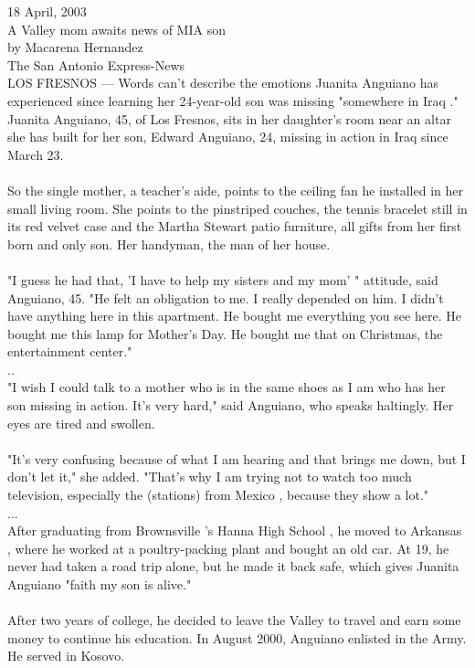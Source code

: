 \documentclass[a4paper]{article}
\begin{document}
\large
18 April, 2003\\
A Valley mom awaits news of MIA son\\
by Macarena Hernandez\\
The San Antonio Express-News\\
LOS FRESNOS — Words can't describe the emotions Juanita Anguiano has experienced since learning her 24-year-old son was missing "somewhere in Iraq ." Juanita Anguiano, 45, of Los Fresnos, sits in her daughter's room near an altar she has built for her son, Edward Anguiano, 24, missing in action in Iraq since March 23.\\
\\
So the single mother, a teacher's aide, points to the ceiling fan he installed in her small living room. She points to the pinstriped couches, the tennis bracelet still in its red velvet case and the Martha Stewart patio furniture, all gifts from her first born and only son.  Her handyman, the man of her house.\\
\\
"I guess he had that, 'I have to help my sisters and my mom' " attitude, said Anguiano, 45. "He felt an obligation to me. I really depended on him. I didn't have anything here in this apartment. He bought me everything you see here. He bought me this lamp for Mother's Day. He bought me that on Christmas, the entertainment center."\\
..\\
"I wish I could talk to a mother who is in the same shoes as I am who has her son missing in action. It's very hard," said Anguiano, who speaks haltingly.  Her eyes are tired and swollen.\\
\\
"It's very confusing because of what I am hearing and that brings me down, but I don't let it," she added. "That's why I am trying not to watch too much television, especially the (stations) from Mexico , because they show a lot."\\
...\\
After graduating from Brownsville 's Hanna High School , he moved to Arkansas , where he worked at a poultry-packing plant and bought an old car. At 19, he never had taken a road trip alone, but he made it back safe, which gives Juanita Anguiano "faith my son is alive."\\
\\
After two years of college, he decided to leave the Valley to travel and earn some money to continue his education.  In August 2000, Anguiano enlisted in the Army. He served in Kosovo.\\
\end{document}
